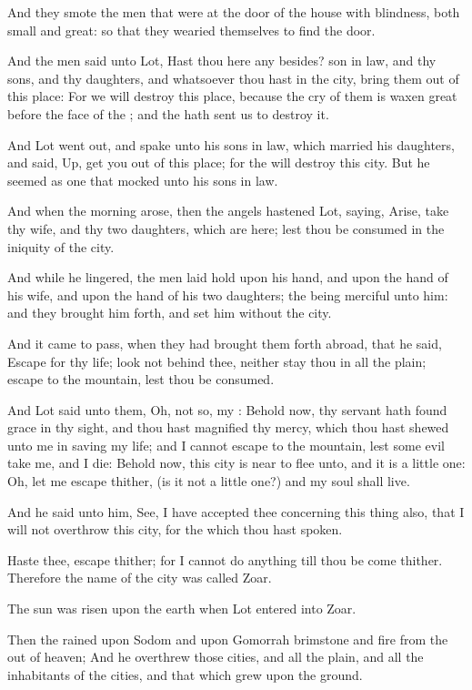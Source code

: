 \verse And they smote the men that were at the door of the house with
blindness, both small and great: so that they wearied themselves to
find the door.

\verse And the men said unto Lot, Hast thou here any besides? son in
law, and thy sons, and thy daughters, and whatsoever thou hast in the
city, bring them out of this place: \verse For we will destroy this
place, because the cry of them is waxen great before the face of the
\LORD; and the \LORD hath sent us to destroy it.

\verse And Lot went out, and spake unto his sons in law, which married
his daughters, and said, Up, get you out of this place; for the \LORD
will destroy this city. But he seemed as one that mocked unto his sons
in law.

\verse And when the morning arose, then the angels hastened Lot,
saying, Arise, take thy wife, and thy two daughters, which are here;
lest thou be consumed in the iniquity of the city.

\verse And while he lingered, the men laid hold upon his hand, and upon
the hand of his wife, and upon the hand of his two daughters; the \LORD
being merciful unto him: and they brought him forth, and set him
without the city.

\verse And it came to pass, when they had brought them forth abroad,
that he said, Escape for thy life; look not behind thee, neither stay
thou in all the plain; escape to the mountain, lest thou be consumed.

\verse And Lot said unto them, Oh, not so, my \LORD: \verse Behold now,
thy servant hath found grace in thy sight, and thou hast magnified thy
mercy, which thou hast shewed unto me in saving my life; and I cannot
escape to the mountain, lest some evil take me, and I die: \verse
Behold now, this city is near to flee unto, and it is a little one:
Oh, let me escape thither, (is it not a little one?) and my soul shall
live.

\verse And he said unto him, See, I have accepted thee concerning this
thing also, that I will not overthrow this city, for the which thou
hast spoken.

\verse Haste thee, escape thither; for I cannot do anything till thou
be come thither. Therefore the name of the city was called Zoar.

\verse The sun was risen upon the earth when Lot entered into Zoar.

\verse Then the \LORD rained upon Sodom and upon Gomorrah brimstone and
fire from the \LORD out of heaven; \verse And he overthrew those cities,
and all the plain, and all the inhabitants of the cities, and that
which grew upon the ground.

